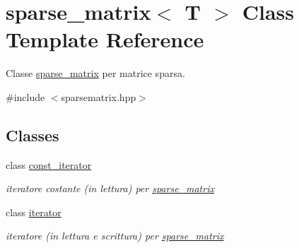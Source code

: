\hypertarget{classsparse__matrix}{}\section{sparse\+\_\+matrix$<$ T $>$ Class Template Reference}
\label{classsparse__matrix}


Classe \hyperlink{classsparse__matrix}{sparse\+\_\+matrix} per matrice sparsa.  




{\ttfamily \#include $<$sparsematrix.\+hpp$>$}

\subsection*{Classes}
\begin{DoxyCompactItemize}
\item 
class \hyperlink{classsparse__matrix_1_1const__iterator}{const\+\_\+iterator}
\begin{DoxyCompactList}\small\item\em iteratore costante (in lettura) per \hyperlink{classsparse__matrix}{sparse\+\_\+matrix} \end{DoxyCompactList}\item 
class \hyperlink{classsparse__matrix_1_1iterator}{iterator}
\begin{DoxyCompactList}\small\item\em iteratore (in lettura e scrittura) per \hyperlink{classsparse__matrix}{sparse\+\_\+matrix} \end{DoxyCompactList}\end{DoxyCompactItemize}
